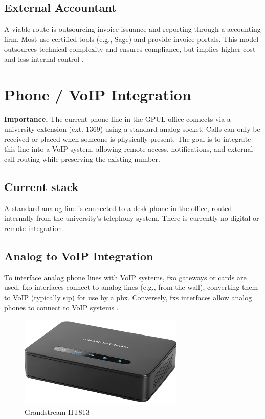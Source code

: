 \subsection{External Accountant}
A viable route is outsourcing invoice issuance and reporting through a accounting firm. Most use certified tools (e.g., Sage) and provide invoice portals. This model outsources technical complexity and ensures compliance, but implies higher cost and less internal control \cite{SageBlogAsesoria}.

\section{Phone / VoIP Integration}

\textbf{Importance.}  The current phone line in the GPUL office connects via a university extension (ext. 1369) using a standard analog socket. Calls can only be received or placed when someone is physically present. The goal is to integrate this line into a VoIP system, allowing remote access, notifications, and external call routing while preserving the existing number.

\subsection{Current stack}

A standard analog line is connected to a desk phone in the office, routed internally from the university's telephony system. There is currently no digital or remote integration.

\subsection{Analog to VoIP Integration}

To interface analog phone lines with VoIP systems, \gls{fxo} gateways or cards are used. \gls{fxo} interfaces connect to analog lines (e.g., from the wall), converting them to VoIP (typically \gls{sip}) for use by a \gls{pbx}. Conversely, \gls{fxs} interfaces allow analog phones to connect to VoIP systems \cite{YeastarFXOvFSX2024,3CX_FXSFXO}.

\begin{figure}[H]
  \centering
  \includegraphics[width=0.7\textwidth]{imaxes/grandstream-ht.png}
  \caption{Grandstream HT813}
  \label{fig:grandstream-ht}
\end{figure}

